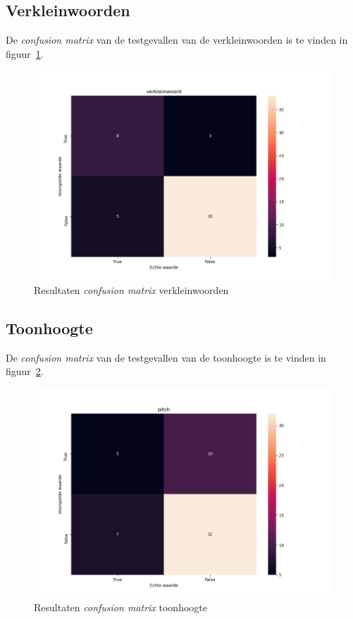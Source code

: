\subsection{Verkleinwoorden}
De \textit{confusion matrix} van de testgevallen van de verkleinwoorden is te vinden in figuur~\ref{fig:cfm_verkleinwoord}.
\begin{figure}
    \centering
    \includegraphics[width=1\textwidth]{./img/cfm_verkleinwoord}
    \caption{\label{fig:cfm_verkleinwoord} Resultaten \textit{confusion matrix} verkleinwoorden}
\end{figure}


\subsection{Toonhoogte}
De \textit{confusion matrix} van de testgevallen van de toonhoogte is te vinden in figuur~\ref{fig:cfm_pitch}.
\begin{figure}
    \centering
    \includegraphics[width=1\textwidth]{./img/cfm_pitch}
    \caption{\label{fig:cfm_pitch} Resultaten \textit{confusion matrix} toonhoogte}
\end{figure}

